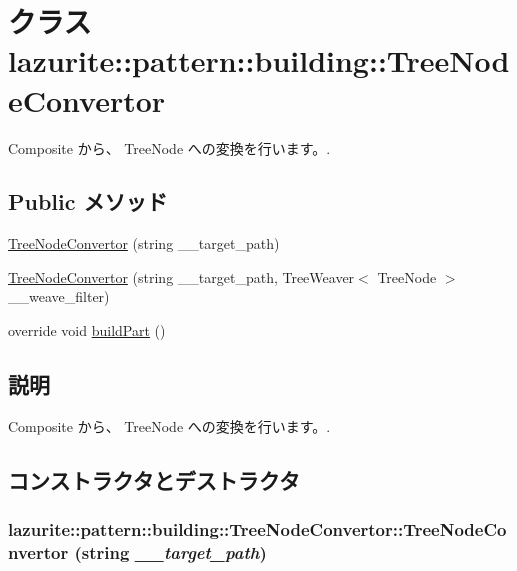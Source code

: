 \hypertarget{classlazurite_1_1pattern_1_1building_1_1_tree_node_convertor}{
\section{クラス lazurite::pattern::building::TreeNodeConvertor}
\label{classlazurite_1_1pattern_1_1building_1_1_tree_node_convertor}
}


Composite から、 TreeNode への変換を行います。.  
\subsection*{Public メソッド}
\begin{DoxyCompactItemize}
\item 
\hyperlink{classlazurite_1_1pattern_1_1building_1_1_tree_node_convertor_a149f94a5eabf3aeefe0c1e0cdbba0244}{TreeNodeConvertor} (string \_\-\_\-target\_\-path)
\item 
\hyperlink{classlazurite_1_1pattern_1_1building_1_1_tree_node_convertor_a737583ada628dc670ba4eb789b8a556a}{TreeNodeConvertor} (string \_\-\_\-target\_\-path, TreeWeaver$<$ TreeNode $>$ \_\-\_\-weave\_\-filter)
\item 
override void \hyperlink{classlazurite_1_1pattern_1_1building_1_1_tree_node_convertor_adf8062163b4f8dda539382373fe8cff2}{buildPart} ()
\end{DoxyCompactItemize}


\subsection{説明}
Composite から、 TreeNode への変換を行います。. 

\subsection{コンストラクタとデストラクタ}
\hypertarget{classlazurite_1_1pattern_1_1building_1_1_tree_node_convertor_a149f94a5eabf3aeefe0c1e0cdbba0244}{
\subsubsection[{TreeNodeConvertor}]{\setlength{\rightskip}{0pt plus 5cm}lazurite::pattern::building::TreeNodeConvertor::TreeNodeConvertor (string {\em \_\-\_\-target\_\-path})}}
\label{classlazurite_1_1pattern_1_1building_1_1_tree_node_convertor_a149f94a5eabf3aeefe0c1e0cdbba0244}

